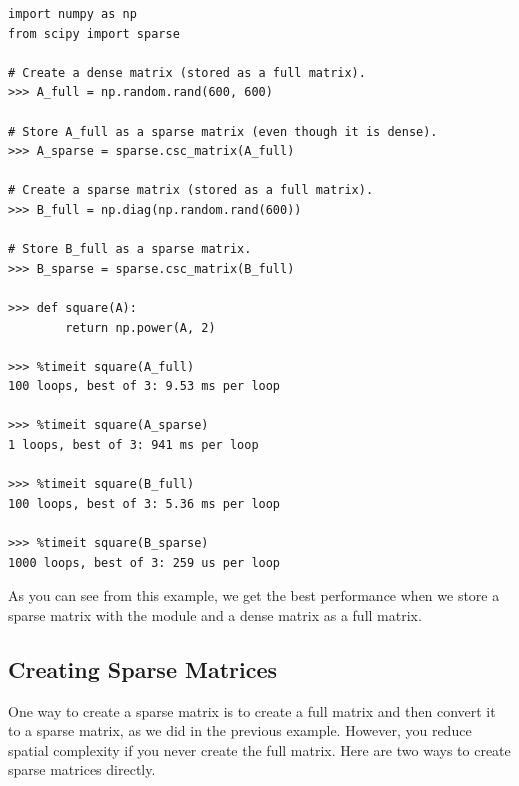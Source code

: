 \begin{lstlisting}
import numpy as np
from scipy import sparse

# Create a dense matrix (stored as a full matrix).
>>> A_full = np.random.rand(600, 600)

# Store A_full as a sparse matrix (even though it is dense).
>>> A_sparse = sparse.csc_matrix(A_full)

# Create a sparse matrix (stored as a full matrix).
>>> B_full = np.diag(np.random.rand(600))

# Store B_full as a sparse matrix.
>>> B_sparse = sparse.csc_matrix(B_full)

>>> def square(A):
        return np.power(A, 2)

>>> %timeit square(A_full)
100 loops, best of 3: 9.53 ms per loop

>>> %timeit square(A_sparse)
1 loops, best of 3: 941 ms per loop

>>> %timeit square(B_full)
100 loops, best of 3: 5.36 ms per loop

>>> %timeit square(B_sparse)
1000 loops, best of 3: 259 us per loop
\end{lstlisting}

As you can see from this example, we get the best performance when we store a sparse matrix with the  module and a dense matrix as a full matrix.

\subsection*{Creating Sparse Matrices} %

One way to create a sparse matrix is to create a full matrix and then convert it to a sparse matrix, as we did in the previous example.
However, you reduce spatial complexity if you never create the full matrix.
Here are two ways to create sparse matrices directly.

